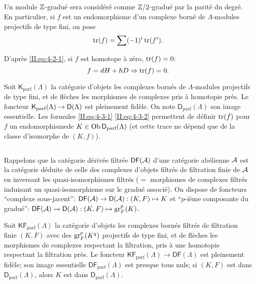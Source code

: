 \subsection{}\label{II:4-3}

Un module $\mathbb{Z}$-gradué sera considéré comme $\mathbb{Z}/2$-gradué par la 
parité du degré. En particulier, si $f$ est un endomorphisme d'un complexe 
borné de $\Lambda$-modules projectifs de type fini, on pose 
\begin{equation}\label{II:eq:4-3-1}
  \operatorname{tr}(f) = \sum (-1)^i \operatorname{tr}(f^i) \text{.}
\end{equation}

D'après \eqref{II:eq:4-2-1}, si $f$ est homotope à zéro, $\operatorname{tr}(f) = 0$: 
\begin{equation}\label{II:eq:4-3-2}
  f = d H + h D \Rightarrow \operatorname{tr}(f) = 0 \text{.}
\end{equation}

Soit $\mathsf{K}_\text{parf}(\Lambda)$ la catégorie d'objets les complexes 
bornés de $\Lambda$-modules projectifs de type fini, et de flèches les 
morphismes de complexes pris à homotopie près. Le foncteur 
$\mathsf{K}_\text{parf}(\Lambda)\to\mathsf{D}(\Lambda)$ est pleinement fidèle. On note 
$\mathsf{D}_\text{parf}(\Lambda)$ son image essentielle. Les formules 
\eqref{II:eq:4-3-1} \eqref{II:eq:4-3-2} permettent de définir $\operatorname{tr}(f)$ pour $f$ 
un endomorphismede $K\in\operatorname{Ob} \mathsf{D}_\text{parf}(\Lambda)$ (et cette trace ne 
dépend que de la classe d'isomorphe de $(K,f)$). 





\subsection{}\label{II:4-4}

Rappelons que la catégorie dérivée filtrée $\mathsf{DF}(\mathcal{A})$ d'une catégorie 
abélienne $\mathcal{A}$ est la catégorie déduite de celle des complexes d'objets 
filtrés de filtration finie de $\mathcal{A}$ en inversant les quasi-isomorphismes 
filtrés ($=$ morphismes de complexes filtrés induisant un quasi-isomorphisme 
sur le gradué associé). On dispose de foncteurs ``complexe sous-jacent'': 
$\mathsf{DF}(\mathcal{A})\to\mathsf{D}(\mathcal{A}): (K,F)\mapsto K$ et ``$p$-ième composante du 
gradué'': $\mathsf{DF}(\mathcal{A})\to\mathsf{D}(\mathcal{A}): (K,F)\mapsto \operatorname{gr}_F^p(K)$. 

Soit $\mathsf{KF}_\text{parf}(\Lambda)$ la catégorie d'objets les complexes 
bornés filtrés de filtration finie $(K,F)$ avec des $\operatorname{gr}_F^p(K^q)$ projectifs 
de type fini, et de flèches les morphismes de complexes respectant la 
filtration, pris à une homotopie respectant la filtration près. Le foncteur 
$\mathsf{KF}_\text{parf}(\Lambda)\to\mathsf{DF}(\Lambda)$ est pleinement fidèle; 
son image essentielle $\mathsf{DF}_\text{parf}(\Lambda)$ est presque tous nuls; 
si $(K,F)$ est dans $\mathsf{D}_\text{parf}(\Lambda)$, alors $K$ est dans 
$\mathsf{D}_\text{parf}(\Lambda)$. 

